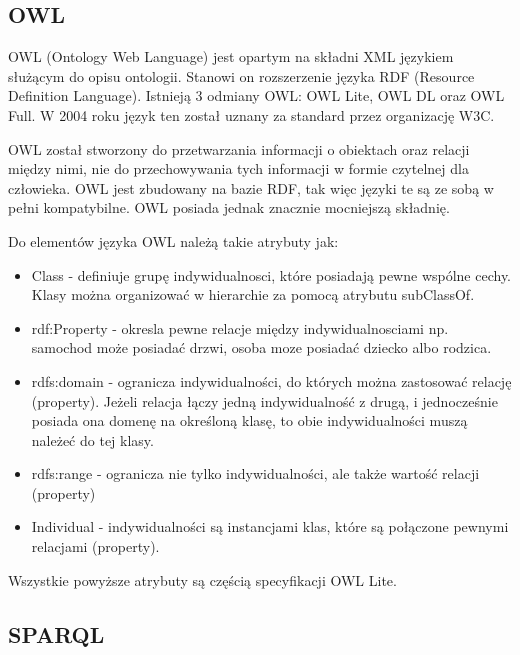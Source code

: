 \subsection{OWL}
\label{sec:owl}

OWL (Ontology Web Language) jest opartym na składni XML językiem służącym do opisu ontologii. Stanowi on rozszerzenie języka RDF (Resource Definition Language). Istnieją 3 odmiany OWL: OWL Lite, OWL DL oraz OWL Full. W 2004 roku język ten został uznany za standard przez organizację W3C.

OWL został stworzony do przetwarzania informacji o obiektach oraz relacji między nimi, nie do przechowywania tych informacji w formie czytelnej dla człowieka. OWL jest zbudowany na bazie RDF, tak więc języki te są ze sobą w pełni kompatybilne. OWL posiada jednak znacznie mocniejszą składnię.

Do elementów języka OWL należą takie atrybuty jak:

\begin{itemize}

\item Class - definiuje grupę indywidualnosci, które posiadają pewne wspólne cechy. Klasy można organizować w hierarchie za pomocą atrybutu subClassOf.


\item rdf:Property - okresla pewne relacje między indywidualnosciami np. samochod może posiadać drzwi, osoba moze posiadać dziecko albo rodzica.

\item rdfs:domain - ogranicza indywidualności, do których można zastosować relację (property). Jeżeli relacja łączy jedną indywidualność z drugą, i jednocześnie posiada ona domenę na określoną klasę, to obie indywidualności muszą należeć do tej klasy.

\item rdfs:range - ogranicza nie tylko indywidualności, ale także wartość relacji (property)

\item Individual - indywidualności są instancjami klas, które są połączone pewnymi relacjami (property).

\end{itemize}

Wszystkie powyższe atrybuty są częścią specyfikacji OWL Lite.



\subsection{SPARQL}
\label{sec:sparql}

